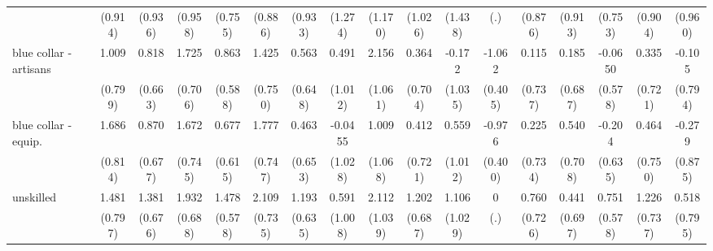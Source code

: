 {\begin{tabular}{l*{16}{c}}
                    &     (0.914)         &     (0.936)         &     (0.958)         &     (0.755)         &     (0.886)         &     (0.933)         &     (1.274)         &     (1.170)         &     (1.026)         &     (1.438)         &         (.)         &     (0.876)         &     (0.913)         &     (0.753)         &     (0.904)         &     (0.960)         \\
[1em]
blue collar - artisans&       1.009         &       0.818         &       1.725\sym{*}  &       0.863         &       1.425         &       0.563         &       0.491         &       2.156\sym{*}  &       0.364         &      -0.172         &      -1.062\sym{**} &       0.115         &       0.185         &     -0.0650         &       0.335         &      -0.105         \\
                    &     (0.799)         &     (0.663)         &     (0.706)         &     (0.588)         &     (0.750)         &     (0.648)         &     (1.012)         &     (1.061)         &     (0.704)         &     (1.035)         &     (0.405)         &     (0.737)         &     (0.687)         &     (0.578)         &     (0.721)         &     (0.794)         \\
[1em]
blue collar - equip.&       1.686\sym{*}  &       0.870         &       1.672\sym{*}  &       0.677         &       1.777\sym{*}  &       0.463         &     -0.0455         &       1.009         &       0.412         &       0.559         &      -0.976\sym{*}  &       0.225         &       0.540         &      -0.204         &       0.464         &      -0.279         \\
                    &     (0.814)         &     (0.677)         &     (0.745)         &     (0.615)         &     (0.747)         &     (0.653)         &     (1.028)         &     (1.068)         &     (0.721)         &     (1.012)         &     (0.400)         &     (0.734)         &     (0.708)         &     (0.635)         &     (0.750)         &     (0.875)         \\
[1em]
unskilled           &       1.481         &       1.381\sym{*}  &       1.932\sym{**} &       1.478\sym{*}  &       2.109\sym{**} &       1.193         &       0.591         &       2.112\sym{*}  &       1.202         &       1.106         &           0         &       0.760         &       0.441         &       0.751         &       1.226         &       0.518         \\
                    &     (0.797)         &     (0.676)         &     (0.688)         &     (0.578)         &     (0.735)         &     (0.635)         &     (1.008)         &     (1.039)         &     (0.687)         &     (1.029)         &         (.)         &     (0.726)         &     (0.697)         &     (0.578)         &     (0.737)         &     (0.795)         \\

\end{tabular}}
